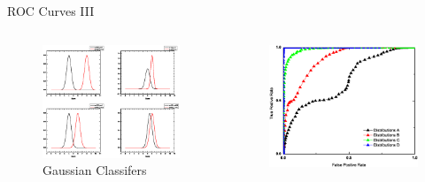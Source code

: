 \begin{frame}{ROC Curves III}
\begin{columns}[onlytextwidth]
\begin{column}{0.45\textwidth}
	\begin{figure}
		\centering
		\includegraphics[height=\textwidth]{images/ROC_GaussDist.eps}
		\caption{Gaussian Classifers}
		\label{fig:ROCGausClassifers}
	\end{figure}
\end{column}
\begin{column}{0.45\textwidth}
	\begin{figure}
		\centering
		\includegraphics[height=\textwidth]{images/ROC_Gaussian.eps}

\end{figure}
\end{column}
\end{columns}
\end{frame}
